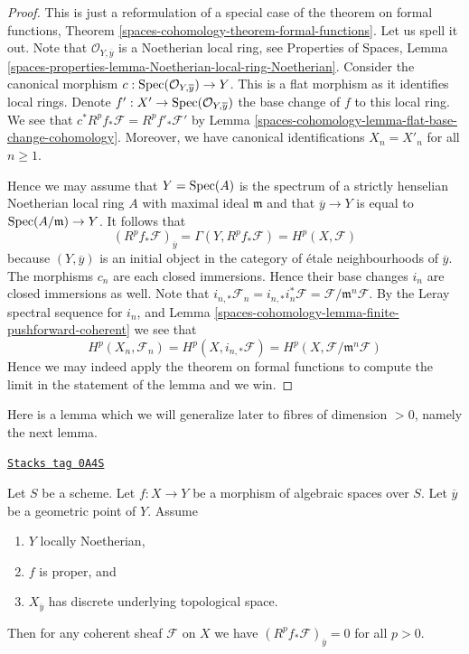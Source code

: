 \begin{proof}
This is just a reformulation of a special case of the theorem
on formal functions, Theorem \ref{spaces-cohomology-theorem-formal-functions}.
Let us spell it out. Note that $\mathcal{O}_{Y, \overline{y}}$
is a Noetherian local ring, see
Properties of Spaces, Lemma
\ref{spaces-properties-lemma-Noetherian-local-ring-Noetherian}.
Consider the canonical morphism
$c : \operatorname{Spec}(\mathcal{O}_{Y, \overline{y}}) \to Y$.
This is a flat morphism as it identifies local rings.
Denote $f' : X' \to \operatorname{Spec}(\mathcal{O}_{Y, \overline{y}})$
the base change of $f$ to this local ring. We see that
$c^*R^pf_*\mathcal{F} = R^pf'_*\mathcal{F}'$ by
Lemma \ref{spaces-cohomology-lemma-flat-base-change-cohomology}.
Moreover, we have canonical identifications $X_n = X'_n$
for all $n \geq 1$.

\medskip\noindent
Hence we may assume that $Y = \operatorname{Spec}(A)$ is the spectrum of
a strictly henselian Noetherian local ring $A$ with maximal ideal
$\mathfrak m$ and that $\overline{y} \to Y$ is equal to
$\operatorname{Spec}(A/\mathfrak m) \to Y$. It follows that
$$
\left(R^pf_*\mathcal{F}\right)_{\overline{y}} =
\Gamma(Y, R^pf_*\mathcal{F}) =
H^p(X, \mathcal{F})
$$
because $(Y, \overline{y})$ is an initial object in the category
of \'etale neighbourhoods of $\overline{y}$.
The morphisms $c_n$ are each closed immersions.
Hence their base changes $i_n$ are closed immersions as well.
Note that $i_{n, *}\mathcal{F}_n = i_{n, *}i_n^*\mathcal{F}
= \mathcal{F}/\mathfrak m^n\mathcal{F}$. By the Leray spectral sequence
for $i_n$, and Lemma \ref{spaces-cohomology-lemma-finite-pushforward-coherent} we see that
$$
H^p(X_n, \mathcal{F}_n) =
H^p(X, i_{n, *}\mathcal{F}) =
H^p(X, \mathcal{F}/\mathfrak m^n\mathcal{F})
$$
Hence we may indeed apply the theorem on formal functions to compute
the limit in the statement of the lemma and we win.
\end{proof}

Here is a lemma which we will generalize later to fibres of
dimension $ > 0$, namely the next lemma.

\begin{lemma}
\label{spaces-cohomology-lemma-higher-direct-images-zero-finite-fibre}
\href{https://stacks.math.columbia.edu/tag/0A4S}{\texttt{Stacks tag 0A4S}}

Let $S$ be a scheme. Let $f : X \to Y$ be a morphism of algebraic spaces
over $S$. Let $\overline{y}$ be a geometric point of $Y$.
Assume
\begin{enumerate}
\item $Y$ locally Noetherian,
\item $f$ is proper, and
\item $X_{\overline{y}}$ has discrete underlying topological space.
\end{enumerate}
Then for any coherent sheaf $\mathcal{F}$ on $X$ we have
$(R^pf_*\mathcal{F})_{\overline{y}} = 0$ for all $p > 0$.
\end{lemma}

